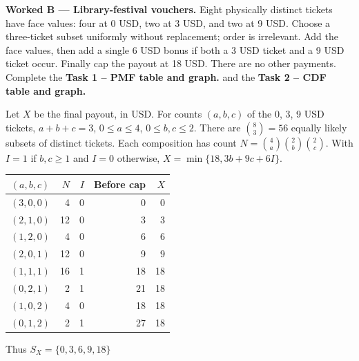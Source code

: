 \medskip
\noindent\textbf{Worked B --- Library-festival vouchers.}
Eight physically distinct tickets have face values: four at 0 USD, two at 3 USD,
and two at 9 USD. Choose a three-ticket subset uniformly without replacement;
order is irrelevant. Add the face values, then add a single 6 USD bonus if
both a 3 USD ticket and a 9 USD ticket occur. Finally cap the payout at 18 USD.
There are no other payments. Complete the \textbf{Task 1 -- PMF table and graph.} and the \textbf{Task 2 -- CDF table and graph.}
\par
Let $X$ be the final payout, in USD.
For counts $(a,b,c)$ of the 0, 3, 9 USD tickets,
$a+b+c=3$, $0\leq a\leq4$, $0\leq b,c\leq2$.
There are $\binom83=56$ equally likely subsets of distinct tickets.
Each composition has count
$N=\binom4a\binom2b\binom2c$.
With $I=1$ if $b,c\geq1$ and $I=0$ otherwise,
$X=\min\{18,3b+9c+6I\}$.
\par\noindent
\begin{minipage}[t]{.40\linewidth}
\vspace{0pt}\centering
\begin{tabular}{@{}crrrr@{}}\toprule
$(a,b,c)$ & $N$ & $I$ & Before cap & $X$\\\midrule
$(3,0,0)$ & 4 & 0 & 0 & 0\\
$(2,1,0)$ & 12 & 0 & 3 & 3\\
$(1,2,0)$ & 4 & 0 & 6 & 6\\
$(2,0,1)$ & 12 & 0 & 9 & 9\\
$(1,1,1)$ & 16 & 1 & 18 & 18\\
$(0,2,1)$ & 2 & 1 & 21 & 18\\
$(1,0,2)$ & 4 & 0 & 18 & 18\\
$(0,1,2)$ & 2 & 1 & 27 & 18\\\bottomrule
\end{tabular}
\end{minipage}\hfill
\begin{minipage}[t]{.57\linewidth}
\vspace{0pt}\centering
{}
\raggedright Thus $S_X=\{0,3,6,9,18\}$
\end{minipage}\par
